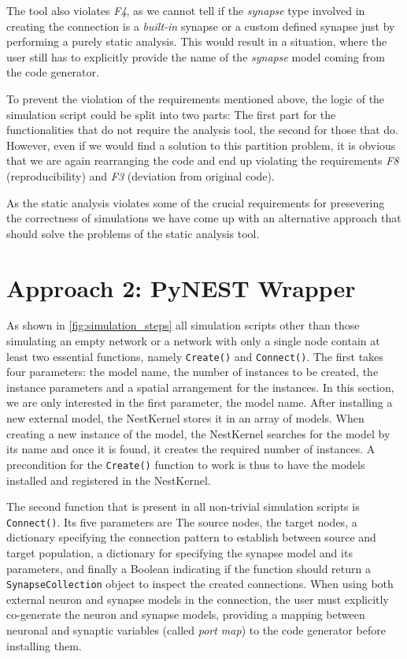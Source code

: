The tool also violates \emph{F4}, as we cannot tell if the \emph{synapse} type involved in creating the connection is a \emph{built-in} synapse or a custom defined synapse just by performing a purely static analysis. This would result in a situation, where the user still has to explicitly provide the name of the \emph{synapse} model coming from the code generator.

To prevent the violation of the requirements mentioned above, the logic of the simulation script could be split into two parts: The first part for the functionalities that do not require the analysis tool, the second for those that do. However, even if we would find a solution to this partition problem, it is obvious that we are again rearranging the code and end up violating the requirements \emph{F8} (reproducibility) and \emph{F3} (deviation from original code).

As the static analysis violates some of the crucial requirements for presevering the correctness of simulations we have come up with an alternative approach that should solve the problems of the static analysis tool.


\section{Approach 2: PyNEST Wrapper}

As shown in \autoref{fig:simulation_steps} all simulation scripts other than those simulating an empty network or a network with only a single node contain at least two essential functions, namely \texttt{Create()} and \texttt{Connect()}. The first takes four parameters: the model name, the number of instances to be created, the instance parameters and a spatial arrangement for the instances. In this section, we are only interested in the first parameter, the model name. After installing a new external model, the NestKernel stores it in an array of models. When creating a new instance of the model, the NestKernel searches for the model by its name and once it is found, it creates the required number of instances. A precondition for the \texttt{Create()} function to work is thus to have the models installed and registered in the NestKernel.

The second function that is present in all non-trivial simulation scripts is \texttt{Connect()}. Its five parameters are The source nodes, the target nodes, a dictionary specifying the connection pattern to establish between source and target population, a dictionary for specifying the synapse model and its parameters, and finally a Boolean indicating if the function should return a \texttt{SynapseCollection} object to inspect the created connections. When using both external neuron and synapse models in the connection, the user must explicitly co-generate the neuron and synapse models, providing a mapping between neuronal and synaptic variables (called \emph{port map}) to the code generator before installing them.

